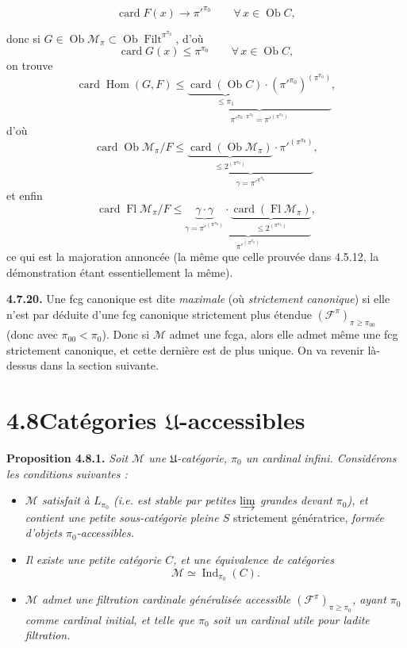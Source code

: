 \documentclass[11pt]{article}
\newcommand{\printedpage}[1]{\marginpar{\footnotesize p.~#1}}
\newcommand{\msp}[1]{\marginpar{\footnotesize [#1]}}
\newcommand{\Ob}{\operatorname{Ob}}
\newcommand{\Fl}{\operatorname{Fl}}
\newcommand{\card}{\operatorname{card}}
\newcommand{\Hom}{\operatorname{Hom}}
\newcommand{\Filt}{\operatorname{Filt}}
\newcommand{\Ind}{\operatorname{Ind}}
\begin{document}
\printedpage{64}

\msp{page 186}

\[ \card F(x) \longrightarrow \pi'^{\pi_0} \qquad \forall\, x \in \Ob C , \] %

donc si $G \in \Ob \mathcal{M}_\pi \subset \Ob \Filt^{\pi^{\pi_0}}$, d'où
\[ \card G(x) \leqslant \pi^{\pi_0} \qquad \forall\, x \in \Ob C , \]
on trouve
\[ \card \Hom(G,F) \leqslant \underbrace{\underbrace{\card(\Ob C)}_{\leqslant \pi_1}\cdot(\pi'^{\pi_0})^{(\pi^{\pi_0})}}_{\pi'^{\pi_0\cdot\pi^{\pi_0}} = \pi'^{(\pi^{\pi_0})}} , \]
d'où
\[ \card \Ob \mathcal{M}_\pi/F \leqslant \underbrace{\underbrace{\card(\Ob \mathcal{M}_\pi)}_{\leqslant 2^{(\pi^{\pi_0})}}\cdot\pi'^{(\pi^{\pi_0})}}_{\gamma = \pi'^{\pi^{\pi_0}}} , \]
et enfin
\[ \card \Fl \mathcal{M}_\pi/F \leqslant \underbrace{\underbrace{\gamma\cdot\gamma}_{\gamma = \pi'^{(\pi^{\pi_0})}}\cdot\underbrace{\card(\Fl \mathcal{M}_\pi)}_{\leqslant 2^{(\pi^{\pi_0})}}}_{\pi'^{(\pi^{\pi_0})}} , \]
ce qui est la majoration annoncée (la même que celle prouvée dans 4.5.12, la démonstration étant essentiellement la même).

\msp{page 187}

\textbf{4.7.20.} Une fcg canonique est dite \textit{maximale} (où \textit{strictement canonique}) si elle n'est par déduite d'une fcg canonique strictement plus étendue $(\mathcal{F}^\pi)_{\pi\geqslant\pi_{00}}$ (donc avec $\pi_{00} < \pi_0$). Donc si $\mathcal{M}$ admet une fcga, alors elle admet même une fcg strictement canonique, et cette dernière est de plus unique. On va revenir là-dessus dans la section suivante. %

\section*{4.8\quad Catégories $\mathfrak{U}$-accessibles}

\textbf{Proposition 4.8.1.} \textit{Soit $\mathcal{M}$ une $\mathfrak{U}$-catégorie, $\pi_0$ un cardinal infini. Considérons les conditions suivantes :}
\begin{itemize}[label={}]
\item[\textit{a)}] \textit{$\mathcal{M}$ satisfait à $L_{\pi_0}$ (i.e. est stable par petites $\varinjlim$ grandes devant $\pi_0$), et contient une petite sous-catégorie pleine $S$} strictement génératrice, \textit{formée d'objets $\pi_0$-accessibles.}
\item[\textit{b)}] \textit{Il existe une petite catégorie $C$, et une équivalence de catégories}
\[ \mathcal{M} \simeq \Ind_{\pi_0}(C) . \]
\item[\textit{c)}] \textit{$\mathcal{M}$ admet une filtration cardinale généralisée accessible $(\mathcal{F}^\pi)_{\pi\geqslant\pi_0}$, ayant $\pi_0$ comme cardinal initial, et telle que $\pi_0$ soit un cardinal utile pour ladite filtration.}
\end{itemize}
\end{document}
